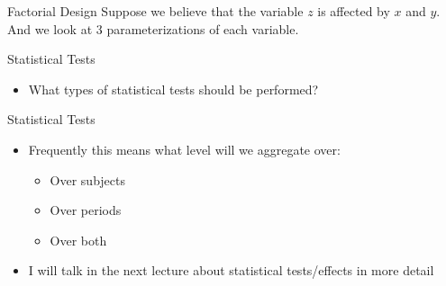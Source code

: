 \documentclass{beamer}
\begin{document}
\begin{frame}{Factorial Design}
Suppose we believe that the variable $z$ is affected by $x$ and $y$. And we look at 3 parameterizations of each variable.

\begin{center}
\end{center}
\end{frame}

\begin{frame}{Statistical Tests}
\begin{itemize}
\item What types of statistical tests should be performed?
\end{itemize}
\end{frame}

\begin{frame}{Statistical Tests}
\begin{itemize}
\item Frequently this means what level will we aggregate over:
	\begin{itemize}
		\item Over subjects
		\item Over periods
		\item Over both
	\end{itemize}
\item I will talk in the next lecture about statistical tests/effects in more detail
\end{itemize}
\end{frame}
\end{document}
